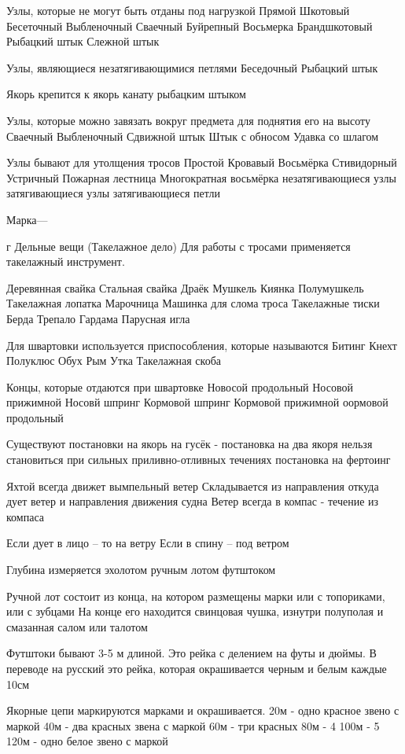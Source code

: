 \documentclass{article}        %
\begin{document}
Узлы, которые не могут быть отданы под нагрузкой
	Прямой
	Шкотовый
	Бесеточный
	Выбленочный
	Сваечный
	Буйрепный
	Восьмерка
	Брандшкотовый
	Рыбацкий штык
	Слежной штык

Узлы, являющиеся незатягивающимися петлями
	Беседочный
	Рыбацкий штык

Якорь крепится к якорь канату рыбацким штыком

Узлы, которые можно завязать вокруг предмета для поднятия его на высоту
	Сваечный
	Выбленочный
	Сдвижной штык
	Штык с обносом
	Удавка со шлагом

Узлы бывают
	для утолщения тросов
		Простой
		Кровавый
		Восьмёрка
		Стивидорный
		Устричный
		Пожарная лестница
		Многократная восьмёрка
	незатягивающиеся узлы
	затягивающиеся узлы
	затягивающиеся петли
	
Марка---

г
Дельные вещи (Такелажное дело)
Для работы с тросами применяется такелажный инструмент. 


	Деревянная свайка
	Стальная свайка
	Драёк
	Мушкель
	Киянка
	Полумушкель
	Такелажная лопатка
	Марочница
	Машинка для слома троса
	Такелажные тиски
	Берда
	Трепало
	Гардама
	Парусная игла

Для швартовки используется приспособления, которые называются
	Битинг
	Кнехт
	Полуклюс
	Обух
	Рым
	Утка
	Такелажная скоба

Концы, которые отдаются при швартовке
	Новосой продольный
	Носовой прижимной
	Носовй шпринг
	Кормовой шпринг
	Кормовой прижимной
	оормовой продольный

Существуют постановки на якорь
	на гусёк - постановка на два якоря
		нельзя становиться при сильных приливно-отливных течениях
	постановка на фертоинг


Яхтой всегда движет вымпельный ветер
Складывается из направления откуда дует ветер и направления движения судна
Ветер всегда в компас - течение из компаса

Если дует в лицо -- то на ветру
Если в спину -- под ветром

Глубина измеряется
	эхолотом
	ручным лотом
	футштоком

Ручной лот состоит из конца, на котором размещены марки или с топориками, или с зубцами
На конце его находится свинцовая чушка, изнутри полуполая и смазанная салом или талотом

Футштоки бывают 3-5 м длиной. Это рейка с делением на футы и дюймы. В переводе на русский это рейка, которая окрашивается черным и белым каждые 10см

Якорные цепи маркируются марками и окрашивается.
20м - одно красное звено с маркой
40м - два красных звена с маркой
60м - три красных
80м - 4
100м - 5
120м - одно белое звено с маркой
\end{document}
